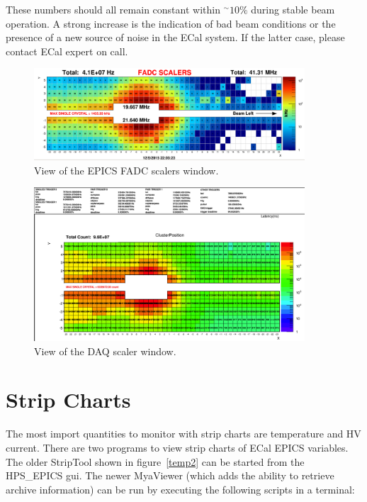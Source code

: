 \documentclass[12pt]{article}
\begin{document}
      These numbers should all remain constant within $^\sim10\%$ during stable beam operation. A strong increase is the indication of bad beam conditions or the presence of a new source of noise in the ECal system.  If the latter case, please contact ECal expert on call.
\begin{figure}[htbp]
\center
\includegraphics[width=0.9\textwidth]{pics/fadcscalers_2015run.png}
\caption{ \label{Scalers} View of the EPICS FADC scalers window.}
\end{figure}
\begin{figure}[htbp]
\center
\includegraphics[width=0.9\textwidth]{pics/ecal-cluster-12-20-14.png}
\caption{ \label{DAQscalers} View of the DAQ scaler window.}
\end{figure}

\newpage
  \section{Strip Charts}
      The most import quantities to monitor with strip charts are temperature and HV current.  There are two programs to view strip charts of ECal EPICS variables.  The older StripTool shown in figure~\ref{temp2} can be started from the HPS\_EPICS gui.  The newer MyaViewer (which adds the ability to retrieve archive information) can be run by executing the following scripts in a terminal:
      
\end{document}
